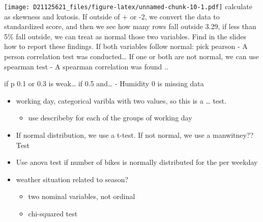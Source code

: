 \documentclass[
]{article}
\providecommand{\tightlist}{%
  \setlength{\itemsep}{0pt}\setlength{\parskip}{0pt}}
\begin{document}
\texttt{[image: D21125621\_files/figure-latex/unnamed-chunk-10-1.pdf]}
calculate as skewness and kutosis. If outside of + or -2, we convert the
data to standardized score, and then we see how many rows fall outside
3.29, if less than 5\% fall outside, we can treat as normal those two
variables. Find in the slides how to report these findings. If both
variables follow normal: pick pearson - A person correlation test was
conducted\ldots{} If one or both are not normal, we can use spearman
test - A spearman correlation was found ..

if p 0.1 or 0.3 is weak\ldots{} if 0.5 and\ldots{} - Humidity 0 is
missing data

\begin{itemize}
\item
  working day, categorical varibla with two values, so this is a
  \ldots{} test.

  \begin{itemize}
  \tightlist
  \item
    use describeby for each of the groups of working day
  \end{itemize}
\item
  If normal distribution, we use a t-test. If not normal, we use a
  manwitney??Test
\item
  Use anova test if number of bikes is normally distributed for the per
  weekday
\item
  weather situation related to season?

  \begin{itemize}
  \tightlist
  \item
    two nominal variables, not ordinal
  \item
    chi-squared test
  \end{itemize}
\end{itemize}
\end{document}
